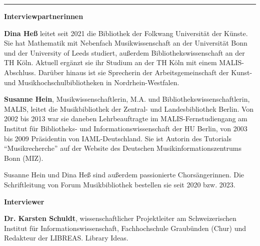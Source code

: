 \begin{center}\rule{0.5\linewidth}{0.5pt}\end{center}

\textbf{Interviewpartnerinnen}

\textbf{Dina Heß} leitet seit 2021 die Bibliothek der Folkwang Universität der Künste. 
Sie hat Mathematik mit Nebenfach Musikwissenschaft an der Universität Bonn und 
der University of Leeds studiert, außerdem Bibliothekswissenschaft an der TH Köln. 
Aktuell ergänzt sie ihr Studium an der TH Köln mit einem MALIS-Abschluss. Darüber 
hinaus ist sie Sprecherin der Arbeitsgemeinschaft der Kunst- und Musikhochschulbibliotheken 
in Nordrhein-Westfalen.

\textbf{Susanne Hein}, Musikwissenschaftlerin, M.A. und Bibliothekswissenschaftlerin, MALIS, 
leitet die Musikbibliothek der Zentral- und Landesbibliothek Berlin. Von 2002 bis 2013 
war sie daneben Lehrbeauftragte im MALIS-Fernstudiengang am Institut für Bibliotheks- und Informationswissenschaft
der HU Berlin, von 2003 bis 2009 Präsidentin von IAML-Deutschland. Sie ist Autorin des Tutorials 
\enquote{Musikrecherche} auf der Website des Deutschen Musikinformationszentrums Bonn (MIZ).

Susanne Hein und Dina Heß sind außerdem passionierte Chorsängerinnen. Die Schriftleitung von Forum 
Musikbibliothek bestellen sie seit 2020 bzw. 2023.

\textbf{Interviewer}

\textbf{Dr. Karsten Schuldt}, wissenschaftlicher Projektleiter am Schweizerischen Institut für Informationswissenschaft,
Fachhochschule Graubünden (Chur) und Redakteur der LIBREAS. Library Ideas.

